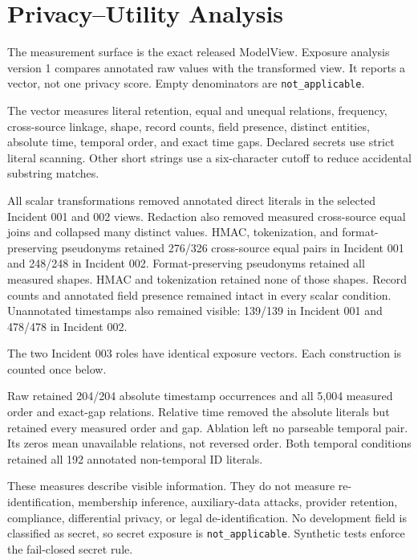 \section{Privacy--Utility Analysis}
\label{sec:privacy}
The measurement surface is the exact released ModelView. Exposure analysis
version 1 compares annotated raw values with the
transformed view. It reports a vector, not one privacy score. Empty
denominators are \texttt{not\_applicable}.

The vector measures literal retention, equal and unequal relations,
frequency, cross-source linkage, shape, record counts, field presence,
distinct entities, absolute time, temporal order, and exact time gaps.
Declared secrets use strict literal scanning. Other short strings use a
six-character cutoff to reduce accidental substring matches.


All scalar transformations removed annotated direct literals in the selected
Incident 001 and 002 views. Redaction also removed measured cross-source equal
joins and collapsed many distinct values. HMAC, tokenization, and
format-preserving pseudonyms retained 276/326 cross-source equal pairs in
Incident 001 and 248/248 in Incident 002. Format-preserving pseudonyms retained
all measured shapes. HMAC and tokenization retained none of those shapes.
Record counts and annotated field presence remained intact in every scalar
condition. Unannotated timestamps also remained visible: 139/139 in Incident
001 and 478/478 in Incident 002.

The two Incident 003 roles have identical exposure vectors. Each construction
is counted once below.

Raw retained 204/204 absolute timestamp occurrences and all 5,004 measured
order and exact-gap relations. Relative time removed the absolute literals
but retained every measured order and gap. Ablation left no parseable temporal
pair. Its zeros mean unavailable relations, not reversed order. Both temporal
conditions retained all 192 annotated non-temporal ID literals.

These measures describe visible information. They do not measure
re-identification, membership inference, auxiliary-data attacks, provider
retention, compliance, differential privacy, or legal de-identification.
No development field is classified as secret, so secret exposure is
\texttt{not\_applicable}. Synthetic tests enforce the fail-closed secret rule.
